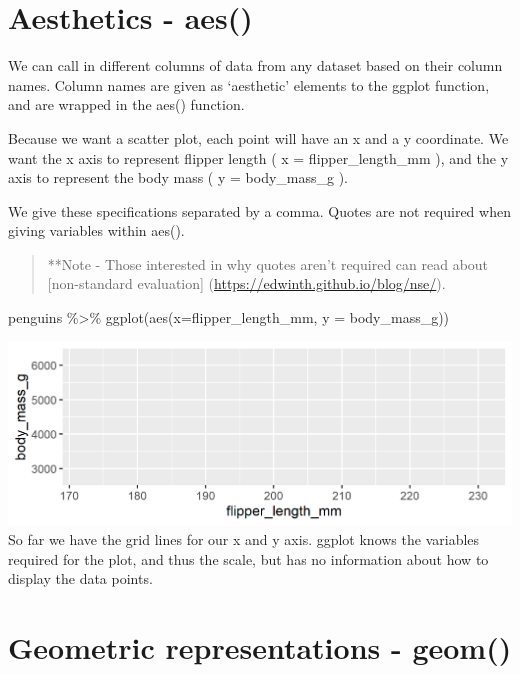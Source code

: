 \documentclass[
]{book}
\newenvironment{Shaded}{\begin{snugshade}}{\end{snugshade}}
\newcommand{\AttributeTok}[1]{\textcolor[rgb]{0.77,0.63,0.00}{#1}}
\newcommand{\FunctionTok}[1]{\textcolor[rgb]{0.00,0.00,0.00}{#1}}
\newcommand{\NormalTok}[1]{#1}
\newcommand{\SpecialCharTok}[1]{\textcolor[rgb]{0.00,0.00,0.00}{#1}}
\begin{document}
\hypertarget{aesthetics---aes}{%
\section{Aesthetics - aes()}\label{aesthetics---aes}}

We can call in different columns of data from any dataset based on their column names. Column names are given as `aesthetic' elements to the ggplot function, and are wrapped in the aes() function.

Because we want a scatter plot, each point will have an x and a y coordinate. We want the x axis to represent flipper length ( x = flipper\_length\_mm ), and the y axis to represent the body mass ( y = body\_mass\_g ).

We give these specifications separated by a comma. Quotes are not required when giving variables within aes().

\begin{quote}
**Note - Those interested in why quotes aren't required can read about {[}non-standard evaluation{]} (\url{https://edwinth.github.io/blog/nse/}).
\end{quote}

\begin{Shaded}
\begin{Highlighting}[]
\NormalTok{penguins }\SpecialCharTok{\%\textgreater{}\%} 
  \FunctionTok{ggplot}\NormalTok{(}\FunctionTok{aes}\NormalTok{(}\AttributeTok{x=}\NormalTok{flipper\_length\_mm, }
             \AttributeTok{y =}\NormalTok{ body\_mass\_g))}
\end{Highlighting}
\end{Shaded}

\includegraphics[width=0.8\linewidth]{images/axes}
So far we have the grid lines for our x and y axis. ggplot knows the variables required for the plot, and thus the scale, but has no information about how to display the data points.

\hypertarget{geometric-representations---geom}{%
\section{Geometric representations - geom()}\label{geometric-representations---geom}}
\end{document}

